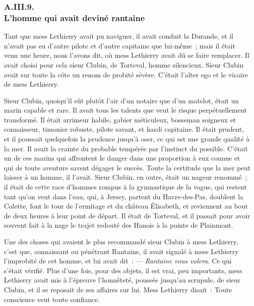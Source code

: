 \documentclass[french,twoside]{book} %
\begin{document}
 \subsubsection[{A.III.9. L’homme qui avait deviné rantaine}]{A.III.9. \\
L’homme qui avait deviné rantaine}
\noindent Tant que mess Lethierry avait pu naviguer, il avait conduit la Durande, et il n’avait pas eu d’autre pilote et d’autre capitaine que lui-même ; mais il était venu une heure, nous l’avons dit, où mess Lethierry avait dû se faire remplacer. Il avait choisi pour cela sieur Clubin, de Torteval, homme silencieux. Sieur Clubin avait sur toute la côte un renom de probité sévère. C’était l’alter ego et le vicaire de mess Lethierry.\par
Sieur Clubin, quoiqu’il eût plutôt l’air d’un notaire que d’un matelot, était un marin capable et rare. Il avait tous les talents que veut le risque perpétuellement transformé. Il était arrimeur habile, gabier méticuleux, bosseman soigneux et connaisseur, timonier robuste, pilote savant, et hardi capitaine. Il était prudent, et il poussait quelquefois la prudence jusqu’à oser, ce qui est une grande qualité à la mer. Il avait la crainte du probable tempérée par l’instinct du possible. C’était un de ces marins qui affrontent le danger  dans une proportion à eux connue et qui de toute aventure savent dégager le succès. Toute la certitude que la mer peut laisser à un homme, il l’avait. Sieur Clubin, en outre, était un nageur renommé ; il était de cette race d’hommes rompus à la gymnastique de la vague, qui restent tant qu’on veut dans l’eau, qui, à Jersey, partent du Havre-des-Pas, doublent la Colette, font le tour de l’ermitage et du château Élisabeth, et reviennent au bout de deux heures à leur point de départ. Il était de Torteval, et il passait pour avoir souvent fait à la nage le trajet redouté des Hanois à la pointe de Plainmont.\par
Une des choses qui avaient le plus recommandé sieur Clubin à mess Lethierry, c’est que, connaissant ou pénétrant Rantaine, il avait signalé à mess Lethierry l’improbité de cet homme, et lui avait dit : — \emph{Rantaine vous volera}. Ce qui s’était vérifié. Plus d’une fois, pour des objets, il est vrai, peu importants, mess Lethierry avait mis à l’épreuve l’honnêteté, poussée jusqu’au scrupule, de sieur Clubin, et il se reposait de ses affaires sur lui. Mess Lethierry disait : Toute conscience veut toute confiance.
\end{document}
